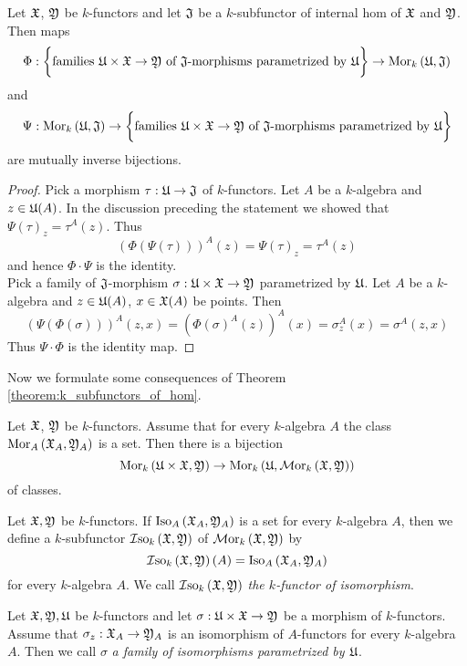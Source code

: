 \begin{theorem}\label{theorem:k_subfunctors_of_hom}
Let ${\mathfrak X}$, ${\mathfrak Y}$ be $k$-functors and let ${\mathfrak J}$ be a $k$-subfunctor of internal hom of ${\mathfrak X}$ and ${\mathfrak Y}$. Then maps 
$$\Phi:\bigg\{\mbox{families }{\mathfrak U}\times {\mathfrak X}\rightarrow {\mathfrak Y}\mbox{ of }{\mathfrak J}\mbox{-morphisms parametrized by }{\mathfrak U}\bigg\} \rightarrow  \mathrm{Mor}_{k}\left({\mathfrak U},{\mathfrak J}\right)$$
and
$$\Psi:\mathrm{Mor}_{k}\left({\mathfrak U},{\mathfrak J}\right) \rightarrow \bigg\{\mbox{families }{\mathfrak U}\times {\mathfrak X}\rightarrow {\mathfrak Y}\mbox{ of }{\mathfrak J}\mbox{-morphisms parametrized by }{\mathfrak U}\bigg\}$$
are mutually inverse bijections.
\end{theorem}
\begin{proof}
Pick a morphism $\tau:{\mathfrak U}\rightarrow {\mathfrak J}$ of $k$-functors. Let $A$ be a $k$-algebra and $z\in {\mathfrak U}(A)$. In the discussion preceding the statement we showed that $\Psi(\tau)_z = \tau^A(z)$. Thus
$$\left(\Phi(\Psi(\tau))\right)^A(z) = \Psi(\tau)_z = \tau^A(z)$$
and hence $\Phi\cdot \Psi$ is the identity.\\
Pick a family of ${\mathfrak J}$-morphism $\sigma:{\mathfrak U}\times {\mathfrak X}\rightarrow {\mathfrak Y}$ parametrized by ${\mathfrak U}$. Let $A$ be a $k$-algebra and $z\in {\mathfrak U}(A)$, $x\in {\mathfrak X}(A)$ be points. Then
$$\left(\Psi\left(\Phi(\sigma)\right)\right)^A(z,x) = \left(\Phi(\sigma)^A(z)\right)^A(x) = \sigma_z^A(x) = \sigma^A(z,x)$$
Thus $\Psi\cdot \Phi$ is the identity map.
\end{proof}
\noindent
Now we formulate some consequences of Theorem \ref{theorem:k_subfunctors_of_hom}.

\begin{corollary}\label{corollary:hom_k_functors}
Let ${\mathfrak X}$, ${\mathfrak Y}$ be $k$-functors. Assume that for every $k$-algebra $A$ the class $\mathrm{Mor}_{A}\left({\mathfrak X}_A,{\mathfrak Y}_A\right)$ is a set. Then there is a bijection 
$$\mathrm{Mor}_{k}\left({\mathfrak U}\times {\mathfrak X},{\mathfrak Y}\right)\rightarrow  \mathrm{Mor}_{k}\left({\mathfrak U},\mathcal{M}\mathrm{or}_{k}\left({\mathfrak X},{\mathfrak Y}\right)\right)$$
of classes.
\end{corollary}

\begin{definition}
Let ${\mathfrak X},{\mathfrak Y}$ be $k$-functors. If $\mathrm{Iso}_{A}\left({\mathfrak X}_A,{\mathfrak Y}_A\right)$ is a set for every $k$-algebra $A$, then we define a $k$-subfunctor $\mathcal{I}\mathrm{so}_k\left({\mathfrak X},{\mathfrak Y}\right)$ of $\mathcal{M}\mathrm{or}_k\left({\mathfrak X},{\mathfrak Y}\right)$ by
$$\mathcal{I}\mathrm{so}_k\left({\mathfrak X},{\mathfrak Y}\right)(A) = \mathrm{Iso}_A\left({\mathfrak X}_A,{\mathfrak Y}_A\right)$$
for every $k$-algebra $A$. We call $\mathcal{I}\mathrm{so}_k\left({\mathfrak X},{\mathfrak Y}\right)$ \textit{the $k$-functor of isomorphism}.
\end{definition}

\begin{definition}
Let ${\mathfrak X}, {\mathfrak Y},{\mathfrak U}$ be $k$-functors and let $\sigma:{\mathfrak U}\times {\mathfrak X} \rightarrow {\mathfrak Y}$ be a morphism of $k$-functors. Assume that $\sigma_z:{\mathfrak X}_A\rightarrow {\mathfrak Y}_A$ is an isomorphism of $A$-functors for every $k$-algebra $A$. Then we call $\sigma$ \textit{a family of isomorphisms parametrized by ${\mathfrak U}$}.
\end{definition}

